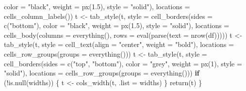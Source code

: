 \documentclass[
]{article}
\newenvironment{Shaded}{\begin{snugshade}}{\end{snugshade}}
\newcommand{\AttributeTok}[1]{\textcolor[rgb]{0.77,0.63,0.00}{#1}}
\newcommand{\ControlFlowTok}[1]{\textcolor[rgb]{0.13,0.29,0.53}{\textbf{#1}}}
\newcommand{\DecValTok}[1]{\textcolor[rgb]{0.00,0.00,0.81}{#1}}
\newcommand{\FloatTok}[1]{\textcolor[rgb]{0.00,0.00,0.81}{#1}}
\newcommand{\FunctionTok}[1]{\textcolor[rgb]{0.00,0.00,0.00}{#1}}
\newcommand{\NormalTok}[1]{#1}
\newcommand{\OtherTok}[1]{\textcolor[rgb]{0.56,0.35,0.01}{#1}}
\newcommand{\SpecialCharTok}[1]{\textcolor[rgb]{0.00,0.00,0.00}{#1}}
\newcommand{\StringTok}[1]{\textcolor[rgb]{0.31,0.60,0.02}{#1}}
\begin{document}
\begin{Shaded}
\begin{Highlighting}[]
        \AttributeTok{color =} \StringTok{"black"}\NormalTok{,}
        \AttributeTok{weight =} \FunctionTok{px}\NormalTok{(}\FloatTok{1.5}\NormalTok{),}
        \AttributeTok{style =} \StringTok{"solid"}\NormalTok{),}
      \AttributeTok{locations =} \FunctionTok{cells\_column\_labels}\NormalTok{()) }
\NormalTok{    t }\OtherTok{\textless{}{-}} \FunctionTok{tab\_style}\NormalTok{(t, }\AttributeTok{style =} \FunctionTok{cell\_borders}\NormalTok{(}\AttributeTok{sides =} \FunctionTok{c}\NormalTok{(}\StringTok{"bottom"}\NormalTok{),}
        \AttributeTok{color =} \StringTok{"black"}\NormalTok{,}
        \AttributeTok{weight =} \FunctionTok{px}\NormalTok{(}\FloatTok{1.5}\NormalTok{),}
        \AttributeTok{style =} \StringTok{"solid"}\NormalTok{),}
      \AttributeTok{locations =} \FunctionTok{cells\_body}\NormalTok{(}\AttributeTok{columns =} \FunctionTok{everything}\NormalTok{(),}
        \AttributeTok{rows =} \FunctionTok{eval}\NormalTok{(}\FunctionTok{parse}\NormalTok{(}\AttributeTok{text =} \FunctionTok{nrow}\NormalTok{(df)))))}
\NormalTok{    t }\OtherTok{\textless{}{-}} \FunctionTok{tab\_style}\NormalTok{(t, }\AttributeTok{style =} \FunctionTok{cell\_text}\NormalTok{(}\AttributeTok{align =} \StringTok{"center"}\NormalTok{,}
        \AttributeTok{weight =} \StringTok{"bold"}\NormalTok{),}
      \AttributeTok{locations =} \FunctionTok{cells\_row\_groups}\NormalTok{(}\AttributeTok{groups =} \FunctionTok{everything}\NormalTok{()))}
\NormalTok{    t }\OtherTok{\textless{}{-}} \FunctionTok{tab\_style}\NormalTok{(t, }\AttributeTok{style =} \FunctionTok{cell\_borders}\NormalTok{(}\AttributeTok{sides =} \FunctionTok{c}\NormalTok{(}\StringTok{"top"}\NormalTok{, }\StringTok{"bottom"}\NormalTok{),}
        \AttributeTok{color =} \StringTok{"grey"}\NormalTok{,}
        \AttributeTok{weight =} \FunctionTok{px}\NormalTok{(}\DecValTok{1}\NormalTok{),}
        \AttributeTok{style =} \StringTok{"solid"}\NormalTok{),}
      \AttributeTok{locations =} \FunctionTok{cells\_row\_groups}\NormalTok{(}\AttributeTok{groups =} \FunctionTok{everything}\NormalTok{()))}
    \ControlFlowTok{if}\NormalTok{ (}\SpecialCharTok{!}\FunctionTok{is.null}\NormalTok{(widths)) \{}
\NormalTok{      t }\OtherTok{\textless{}{-}} \FunctionTok{cols\_width}\NormalTok{(t, }\AttributeTok{.list =}\NormalTok{ widths)}
\NormalTok{    \}}
    \FunctionTok{return}\NormalTok{(t)}
\NormalTok{  \}}
\end{Highlighting}
\end{Shaded}
\end{document}
